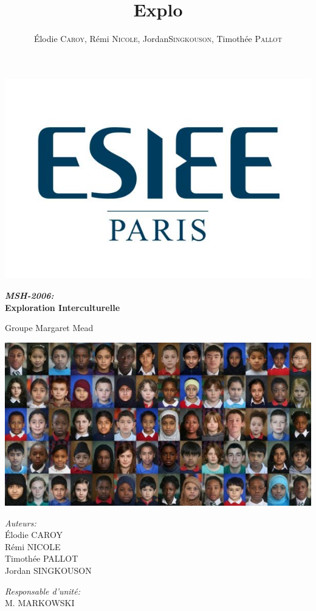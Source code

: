 \documentclass[12pt]{book}
\title{Explo}
\author{\'Elodie \textsc{Caroy}, Rémi \textsc{Nicole}, Jordan\textsc{Singkouson}, Timothée \textsc{Pallot}}
\date{}
\newcommand{\hsc}[1]{{\footnotesize\MakeUppercase{#1}}}
\begin{document}
\begin{titlepage}
	\begin{sffamily}
	\includegraphics[scale=0.3]{esiee.jpg}
	\begin{center}

	\vspace*{2cm}
	{\huge \bfseries \emph{MSH-2006:}\\
	Exploration Interculturelle \\[0.4cm]}
	\begin{center}
	\Large Groupe Margaret Mead
	\end{center}
	
	
	\includegraphics[scale=0.8]{races-620x330.jpg}
	\newline
	
    \begin{minipage}{0.4\textwidth}
      \begin{flushleft} \large
				\emph{Auteurs:}\\
        Élodie C\hsc{aroy}\\
				Rémi N\hsc{icole}\\
				Timothée P\hsc{allot}\\
				Jordan S\hsc{ingkouson}
      \end{flushleft}
    \end{minipage}
    \begin{minipage}{0.4\textwidth}
      \begin{flushright} \large
        \emph{Responsable d'unité:}\\
				M. M\hsc{arkowski}\\
				

\end{flushright}
\end{minipage}
\end{center}
\end{sffamily}
\end{titlepage}
\end{document}
